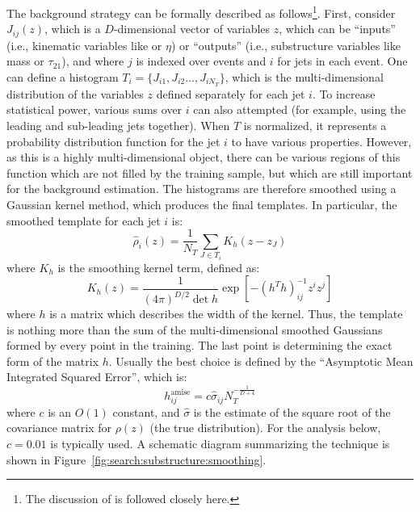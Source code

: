 The background strategy can be formally described as follows\footnote{The discussion of \cite{MassTemplates} is followed closely here.}. First, consider $J_{ij}(z)$, which is a $D$-dimensional vector of variables $z$, which can be ``inputs'' (i.e., kinematic variables like \pt or $\eta$) or ``outputs'' (i.e., substructure variables like mass or $\tau_{21}$), and where $j$ is indexed over events and $i$ for jets in each event. One can define a histogram $T_i = \{J_{i1}, J_{i2}..., J_{iN_T}\}$, which is the multi-dimensional distribution of the variables $z$ defined separately for each jet $i$. To increase statistical power, various sums over $i$ can also attempted (for example, using the leading and sub-leading jets together). When $T$ is normalized, it represents a probability distribution function for the jet $i$ to have various properties. However, as this is a highly multi-dimensional object, there can be various regions of this function which are not filled by the training sample, but which are still important for the background estimation. The histograms are therefore smoothed using a Gaussian kernel method, which produces the final templates. In particular, the smoothed template for each jet $i$ is:
%
\begin{equation}
\hat{\rho}_i(z) = \frac{1}{N_T} \sum_{J\in T_i} K_h(z - z_J)
\end{equation}
%
where $K_h$ is the smoothing kernel term, defined as:
%
\begin{equation}
K_h(z) = \frac{1}{(4\pi)^{D/2} \det h} \exp \left[ - \left(h^T h \right)^{-1}_{ij} z^i z^j \right]
\end{equation}
% 
where $h$ is a matrix which describes the width of the kernel. Thus, the template is nothing more than the sum of the multi-dimensional smoothed Gaussians formed by every point in the training. The last point is determining the exact form of the matrix $h$. Usually the best choice is defined by the ``Asymptotic Mean Integrated Squared Error'', which is:
%
\begin{equation}
h_{ij}^\mathrm{amise} = c \hat{\sigma}_{ij} N_T^{-\frac{1}{D+4}}
\end{equation}
%
where $c$ is an $O(1)$ constant, and $\hat{\sigma}$ is the estimate of the square root of the covariance matrix for $\rho(z)$ (the true distribution). For the analysis below, $c=0.01$ is typically used. A schematic diagram summarizing the technique is shown in Figure~\ref{fig:search:substructure:smoothing}.



